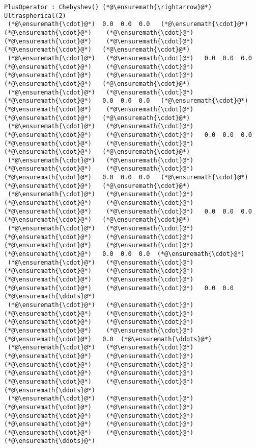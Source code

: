 \documentclass[12pt,a4paper]{article}
\begin{document}
\begin{lstlisting}
PlusOperator : Chebyshev() (*@\ensuremath{\rightarrow}@*) Ultraspherical(2)
 (*@\ensuremath{\cdot}@*)  0.0  0.0  0.0   (*@\ensuremath{\cdot}@*)    (*@\ensuremath{\cdot}@*)    (*@\ensuremath{\cdot}@*)    (*@\ensuremath{\cdot}@*)    (*@\ensuremath{\cdot}@*)    (*@\ensuremath{\cdot}@*)   (*@\ensuremath{\cdot}@*)
 (*@\ensuremath{\cdot}@*)   (*@\ensuremath{\cdot}@*)   0.0  0.0  0.0   (*@\ensuremath{\cdot}@*)    (*@\ensuremath{\cdot}@*)    (*@\ensuremath{\cdot}@*)    (*@\ensuremath{\cdot}@*)    (*@\ensuremath{\cdot}@*)   (*@\ensuremath{\cdot}@*)
 (*@\ensuremath{\cdot}@*)   (*@\ensuremath{\cdot}@*)    (*@\ensuremath{\cdot}@*)   0.0  0.0  0.0   (*@\ensuremath{\cdot}@*)    (*@\ensuremath{\cdot}@*)    (*@\ensuremath{\cdot}@*)    (*@\ensuremath{\cdot}@*)   (*@\ensuremath{\cdot}@*)
 (*@\ensuremath{\cdot}@*)   (*@\ensuremath{\cdot}@*)    (*@\ensuremath{\cdot}@*)    (*@\ensuremath{\cdot}@*)   0.0  0.0  0.0   (*@\ensuremath{\cdot}@*)    (*@\ensuremath{\cdot}@*)    (*@\ensuremath{\cdot}@*)   (*@\ensuremath{\cdot}@*)
 (*@\ensuremath{\cdot}@*)   (*@\ensuremath{\cdot}@*)    (*@\ensuremath{\cdot}@*)    (*@\ensuremath{\cdot}@*)    (*@\ensuremath{\cdot}@*)   0.0  0.0  0.0   (*@\ensuremath{\cdot}@*)    (*@\ensuremath{\cdot}@*)   (*@\ensuremath{\cdot}@*)
 (*@\ensuremath{\cdot}@*)   (*@\ensuremath{\cdot}@*)    (*@\ensuremath{\cdot}@*)    (*@\ensuremath{\cdot}@*)    (*@\ensuremath{\cdot}@*)    (*@\ensuremath{\cdot}@*)   0.0  0.0  0.0   (*@\ensuremath{\cdot}@*)   (*@\ensuremath{\cdot}@*)
 (*@\ensuremath{\cdot}@*)   (*@\ensuremath{\cdot}@*)    (*@\ensuremath{\cdot}@*)    (*@\ensuremath{\cdot}@*)    (*@\ensuremath{\cdot}@*)    (*@\ensuremath{\cdot}@*)    (*@\ensuremath{\cdot}@*)   0.0  0.0  0.0  (*@\ensuremath{\cdot}@*)
 (*@\ensuremath{\cdot}@*)   (*@\ensuremath{\cdot}@*)    (*@\ensuremath{\cdot}@*)    (*@\ensuremath{\cdot}@*)    (*@\ensuremath{\cdot}@*)    (*@\ensuremath{\cdot}@*)    (*@\ensuremath{\cdot}@*)    (*@\ensuremath{\cdot}@*)   0.0  0.0  (*@\ensuremath{\ddots}@*)
 (*@\ensuremath{\cdot}@*)   (*@\ensuremath{\cdot}@*)    (*@\ensuremath{\cdot}@*)    (*@\ensuremath{\cdot}@*)    (*@\ensuremath{\cdot}@*)    (*@\ensuremath{\cdot}@*)    (*@\ensuremath{\cdot}@*)    (*@\ensuremath{\cdot}@*)    (*@\ensuremath{\cdot}@*)   0.0  (*@\ensuremath{\ddots}@*)
 (*@\ensuremath{\cdot}@*)   (*@\ensuremath{\cdot}@*)    (*@\ensuremath{\cdot}@*)    (*@\ensuremath{\cdot}@*)    (*@\ensuremath{\cdot}@*)    (*@\ensuremath{\cdot}@*)    (*@\ensuremath{\cdot}@*)    (*@\ensuremath{\cdot}@*)    (*@\ensuremath{\cdot}@*)    (*@\ensuremath{\cdot}@*)   (*@\ensuremath{\ddots}@*)
 (*@\ensuremath{\cdot}@*)   (*@\ensuremath{\cdot}@*)    (*@\ensuremath{\cdot}@*)    (*@\ensuremath{\cdot}@*)    (*@\ensuremath{\cdot}@*)    (*@\ensuremath{\cdot}@*)    (*@\ensuremath{\cdot}@*)    (*@\ensuremath{\cdot}@*)    (*@\ensuremath{\cdot}@*)    (*@\ensuremath{\cdot}@*)   (*@\ensuremath{\ddots}@*)
\end{lstlisting}
\end{document}
